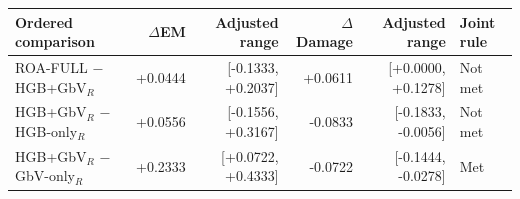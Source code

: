 \begin{tabular}{lrrrrl}
\toprule
Ordered comparison & $\Delta$EM & Adjusted range & $\Delta$Damage & Adjusted range & Joint rule \\
\midrule
ROA-FULL $-$ HGB+GbV$_R$ & +0.0444 & [-0.1333, +0.2037] & +0.0611 & [+0.0000, +0.1278] & Not met \\
HGB+GbV$_R$ $-$ HGB-only$_R$ & +0.0556 & [-0.1556, +0.3167] & -0.0833 & [-0.1833, -0.0056] & Not met \\
HGB+GbV$_R$ $-$ GbV-only$_R$ & +0.2333 & [+0.0722, +0.4333] & -0.0722 & [-0.1444, -0.0278] & Met \\
\bottomrule
\end{tabular}
